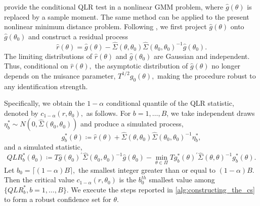 \documentclass[11pt, letterpaper, twoside]{article}
\begin{document}
\Textcite{andrews2016conditional} provide the conditional QLR test in a nonlinear GMM problem, where $\widehat{g}(\theta )$ is replaced by a sample moment. The same method can be applied to the present nonlinear minimum distance problem. Following \textcite{andrews2016conditional}, we first project $\widehat{g}(\theta )$ onto $\widehat{g}(\theta _{0})$ and construct a residual process
%
\begin{equation}
    \widehat{r}(\theta )=\widehat{g}(\theta )-\widehat{\Sigma }(\theta ,\theta _{0})\widehat{\Sigma }(\theta _{0},\theta _{0})^{-1}\widehat{g} (\theta _{0}).  
    \label{red process}
\end{equation}
%
The limiting distributions of $\widehat{r}(\theta )$ and $\widehat{g} (\theta _{0})$ are Gaussian and independent. Thus, conditional on $\widehat{ r}(\theta ),$ the asymptotic distribution of $\widehat{g}(\theta )$ no longer depends on the nuisance parameter, $T^{1/2}g_{0}(\theta ),$ making the procedure robust to any identification strength.

Specifically, we obtain the $1-\alpha $ conditional quantile of the QLR statistic, denoted by $c_{1-\alpha }(r,\theta _{0}),$ as follows. For $b=1,\ldots,B$, we take independent draws $\eta _{b}^{\ast }\sim N(0,\widehat{\Sigma }(\theta _{0},\theta _{0}))$ and produce a simulated process, 
%
\begin{equation}
    g_{b}^{\ast }(\theta ) \coloneqq \widehat{r}(\theta )+\widehat{\Sigma }(\theta ,\theta _{0})\widehat{\Sigma }(\theta _{0},\theta _{0})^{-1}\eta _{b}^{\ast},
\end{equation}
%
and a simulated statistic,
%
\begin{equation}
    QLR_{b}^{\ast }(\theta _{0}) \coloneqq T\widehat{g}(\theta _{0})^{\prime }\widehat{\Sigma }(\theta _{0},\theta _{0})^{-1}\widehat{g}(\theta _{0})-\underset{\theta \in \Pi }{\min }Tg_{b}^{\ast }(\theta )^{\prime }\widehat{\Sigma } (\theta ,\theta )^{-1}g_{b}^{\ast }(\theta ).
\end{equation}
%
Let $b_{0}=\lceil (1-\alpha )B\rceil ,$ the smallest integer greater than or equal to $(1-\alpha )B$. Then the critical value $c_{1-\alpha }(r,\theta _{0})$ is the $b_{0}^{th}$ smallest value among $\{QLR_{b}^{\ast },b=1,\ldots,B\}$.
We execute the steps reported in \cref{alg:constructing_the_cs} to form a robust confidence set for $\theta$.
\end{document}
